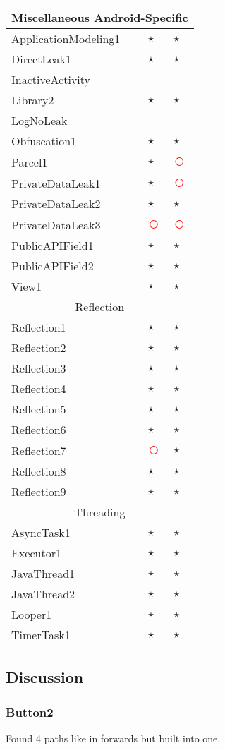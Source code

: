 \documentclass[../draft.tex]{subfiles}
\newcommand{\fn}{\textcolor{red}{\textcircled{ }}}
\newcommand{\tp}[0]{\textcircled{$\star$}}
\newcommand{\tsub}[1]{\multicolumn{3}{c}{#1}\\\hline}
\begin{document}
\begin{longtable}{l | l | l}
        \hline
        \tsub{Miscellaneous Android-Specific}
        ApplicationModeling1 & \tp & \tp\\
        DirectLeak1 & \tp & \tp\\
        InactiveActivity &  & \\
        Library2 & \tp & \tp\\
        LogNoLeak & & \\
        Obfuscation1 & \tp & \tp\\
        Parcel1 & \tp & \fn\\
        PrivateDataLeak1 & \tp & \fn\\
        PrivateDataLeak2 & \tp & \tp\\
        PrivateDataLeak3 & \fn & \fn\\
        PublicAPIField1 & \tp & \tp\\
        PublicAPIField2 & \tp & \tp\\
        View1 & \tp & \tp\\
        \hline
        \tsub{Reflection}
        Reflection1 & \tp & \tp\\
        Reflection2 & \tp & \tp\\
        Reflection3 & \tp & \tp\\
        Reflection4 & \tp & \tp\\
        Reflection5 & \tp & \tp\\
        Reflection6 & \tp & \tp\\
        Reflection7 & \fn & \tp\\
        Reflection8 & \tp & \tp\\
        Reflection9 & \tp & \tp\\
        \hline
        \tsub{Threading}
        AsyncTask1 & \tp & \tp\\
        Executor1 & \tp & \tp\\
        JavaThread1 & \tp & \tp\\
        JavaThread2 & \tp & \tp\\
        Looper1 & \tp & \tp\\
        TimerTask1 & \tp & \tp\\
    \end{longtable}

    \subsection{Discussion}
    \subsubsection{Button2}
    Found 4 paths like in forwards but built into one.
\end{document}
